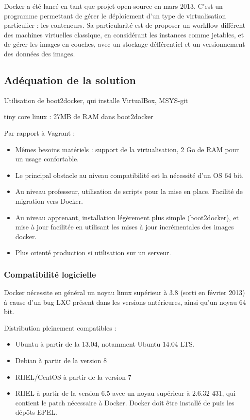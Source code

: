 \documentclass[a4paper,11pt]{report}
\begin{document}
Docker\cite{website:whatis-docker} a été lancé en tant que projet open-source en mars 2013.
C'est un programme permettant de gérer le déploiement d'un type de virtualisation particulier : les conteneurs. Sa particularité est de proposer un workflow différent des machines virtuelles classique, en considérant les instances comme jetables, et de gérer les images en couches, avec un stockage défférentiel et un versionnement des données des images.
  
\subsection{Adéquation de la solution}

Utilisation de boot2docker, qui installe VirtualBox, MSYS-git

tiny core linux : 27MB de RAM dans  boot2docker

Par rapport à Vagrant :
\begin{itemize}
  \item Mêmes besoins matériels : support de la virtualisation, 2 Go de RAM pour un usage confortable.
  \item Le principal obstacle au niveau compatibilité est la nécessité d'un OS 64 bit.
  \item Au niveau professeur, utilisation de scripts pour la mise en place. Facilité de migration vers Docker.
  \item Au niveau apprenant, installation légèrement plus simple (boot2docker), et mise à jour facilitée en utilisant les mises à jour incrémentales des images docker.
  \item Plus orienté production si utilisation sur un serveur.
\end{itemize}

\subsubsection{Compatibilité logicielle}

Docker nécessite en général un noyau linux supérieur à 3.8 (sorti en février 2013) à cause d'un bug LXC présent dans les versions antérieures, ainsi qu'un noyau 64 bit.

Distribution pleinement compatibles :
\begin{itemize}
  \item Ubuntu à partir de la 13.04, notamment Ubuntu 14.04 LTS.
  \item Debian à partir de la version 8
  \item RHEL/CentOS à partir de la version 7
  \item RHEL à partir de la version 6.5 avec un noyau supérieur à 2.6.32-431, qui contient le patch nécessaire à Docker. Docker doit être installé de puis les dépôts EPEL.
\end{itemize}
\end{document}
